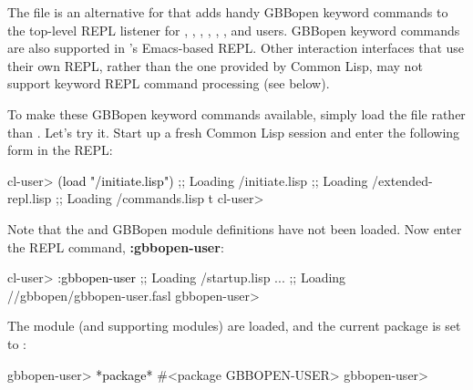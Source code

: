 \documentclass[10pt,twoside,english,pdftex]{article}
\begin{document}
The file  is an
alternative for  that adds
handy GBBopen keyword commands to the top-level REPL listener for
,
,
,
,
,
,
 and
users.  GBBopen keyword commands
are also supported in
's Emacs-based REPL.
Other interaction interfaces that use their own REPL, rather than the one
provided by Common Lisp, may not support keyword REPL command processing
(see below).

To make these GBBopen keyword commands available, simply load the file
 rather than
.  Let's try it.  Start up a fresh
Common Lisp session and enter the following form in the REPL:
%
\W\supp
\begin{example}
\textcolor{darkergray}{%
  cl-user> \textcolor{black}{(load "/initiate.lisp")}
  ;; Loading /initiate.lisp
  ;;  Loading /extended-repl.lisp
  ;;  Loading /commands.lisp
  t
  cl-user>}
\end{example}

%
Note that the  and GBBopen
module definitions have not been loaded.  Now enter the REPL
command, \textbf{:gbbopen-user}:
%
\W\supp
\begin{example}
\textcolor{darkergray}{%
  cl-user> \textcolor{black}{:gbbopen-user}
  ;; Loading /startup.lisp
     ...
  ;; Loading //gbbopen/gbbopen-user.fasl
  gbbopen-user>}
\end{example}
%
The  module (and supporting modules) are loaded, and the
current package is set to :
%
\W\supp\notpretop
\begin{example}
\textcolor{darkergray}{%
  gbbopen-user> \textcolor{black}{*package*}
  #<package GBBOPEN-USER>
  gbbopen-user>}
\end{example}
\end{document}
